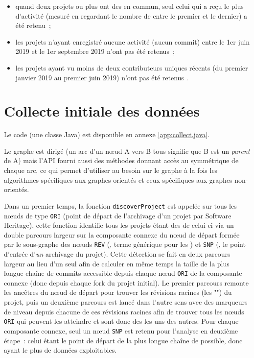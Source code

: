 \begin{itemize}
    \item quand deux projets ou plus ont des  en commun, seul celui qui a reçu le plus
        d'activité (mesuré en regardant le nombre de  entre le premier et le dernier) a été
        retenu ;
    \item les projets n'ayant enregistré aucune activité (aucun commit) entre le 1er juin 2019 et le 1er
        septembre 2019 n'ont pas été retenus ;
    \item les projets ayant vu moins de deux contributeurs uniques récents (du premier janvier 2019 au premier
        juin 2019) n'ont pas été retenus .
\end{itemize}

\section{Collecte initiale des données}


Le code (une classe Java) est disponible en annexe \ref{app:collect.java}.

Le graphe est dirigé (un arc d'un nœud A vers B tous signifie que B est un  \emph{parent} de A)
mais l'API fourni aussi des méthodes donnant accès au symmétrique de chaque arc, ce qui permet d'utiliser au
besoin sur le graphe à la fois les algorithmes spécifiques aux graphes orientés et ceux spécifiques aux
graphes non-orientés.

Dans un premier temps, la fonction \texttt{discoverProject} est appelée sur tous les nœuds de type
\texttt{ORI} (point de départ de l'archivage d'un projet par Software Heritage), cette fonction identifie tous
les projets étant des  de celui-ci via un double parcours largeur sur la composante connexe du nœud
de départ formée par le sous-graphe des nœuds \texttt{REV} (, terme générique pour les
) et \texttt{SNP} (, le point d'entrée d'\emph{un} archivage du projet). Cette
détection se fait en deux parcours largeur au lieu d'un seul afin de calculer en même temps la taille de la
plus longue chaîne de commits accessible depuis chaque nœud \texttt{ORI} de la composante connexe (donc depuis
chaque fork du projet initial). Le premier parcours remonte les ancêtres du nœud de départ pour trouver les
révisions racines (les "") du projet, puis un deuxième parcours est lancé dans l'autre
sens avec des marqueurs de niveau depuis chacune de ces révisions racines afin de trouver tous les nœuds
\texttt{ORI} qui peuvent les atteindre et sont donc des  les uns des autres. Pour chaque composante
connexe, seul un nœud \texttt{SNP} est retenu pour l'analyse en deuxième étape : celui étant le point de
départ de la plus longue chaîne de  possible, donc ayant le plus de données exploitables.

